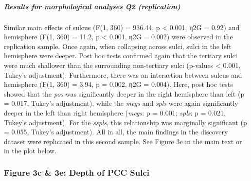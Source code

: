 \documentclass[
]{article}
\newenvironment{Shaded}{\begin{snugshade}}{\end{snugshade}}
\newcommand{\CommentTok}[1]{\textcolor[rgb]{0.56,0.35,0.01}{\textit{#1}}}
\newcommand{\DataTypeTok}[1]{\textcolor[rgb]{0.13,0.29,0.53}{#1}}
\newcommand{\KeywordTok}[1]{\textcolor[rgb]{0.13,0.29,0.53}{\textbf{#1}}}
\newcommand{\NormalTok}[1]{#1}
\newcommand{\OperatorTok}[1]{\textcolor[rgb]{0.81,0.36,0.00}{\textbf{#1}}}
\newcommand{\StringTok}[1]{\textcolor[rgb]{0.31,0.60,0.02}{#1}}
\begin{document}
\hypertarget{results-for-morphological-analyses-q2-replication}{%
\subparagraph{Results for morphological analyses Q2
(replication)}\label{results-for-morphological-analyses-q2-replication}}

Similar main effects of sulcus (F(1, 360) = 936.44, p \textless{} 0.001,
η2G = 0.92) and hemisphere (F(1, 360) = 11.2, p \textless{} 0.001, η2G =
0.002) were observed in the replication sample. Once again, when
collapsing across sulci, sulci in the left hemisphere were deeper. Post
hoc tests confirmed again that the tertiary sulci were much shallower
than the surrounding non-tertiary sulci (p-values \textless{} 0.001,
Tukey's adjustment). Furthermore, there was an interaction between
sulcus and hemisphere (F(1, 360) = 3.94, p = 0.002, η2G = 0.004). Here,
post hoc tests showed that the \emph{pos} was significantly deeper in
the right hemisphere than left (p = 0.017, Tukey's adjustment), while
the \emph{mcgs} and \emph{spls} were again significantly deeper in the
left than right hemisphere (\emph{mcgs}: p = 0.001; \emph{spls}: p =
0.021, Tukey's adjustment). For the \emph{sspls}, this relationship was
marginally significant (p = 0.055, Tukey's adjustment). All in all, the
main findings in the discovery dataset were replicated in this second
sample. See Figure 3e in the main text or in the plot below.

\hypertarget{figure-3c-3e-depth-of-pcc-sulci}{%
\subsubsection{Figure 3c \& 3e: Depth of PCC
Sulci}\label{figure-3c-3e-depth-of-pcc-sulci}}

\begin{Shaded}
\end{Shaded}
\end{document}
